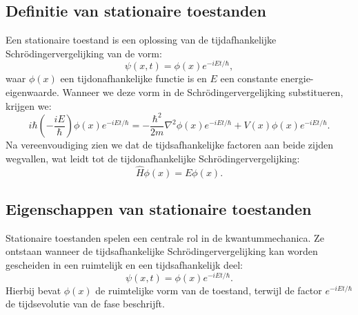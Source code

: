 \documentclass{report} %
\begin{document}
    \subsection{Definitie van stationaire toestanden}
    Een stationaire toestand is een oplossing van de tijdafhankelijke Schrödingervergelijking van de vorm:
    \[
        \psi(x,t) = \phi(x)e^{-iEt/\hbar},
    \]
    waar $\phi(x)$ een tijdonafhankelijke functie is en $E$ een constante energie-eigenwaarde.
    Wanneer we deze vorm in de Schrödingervergelijking substitueren, krijgen we:
    \[
        i\hbar \left(-\frac{iE}{\hbar}\right) \phi(x)e^{-iEt/\hbar} = -\frac{\hbar^2}{2m} \nabla^2 \phi(x)e^{-iEt/\hbar} + V(x)\phi(x)e^{-iEt/\hbar}.
    \]
    Na vereenvoudiging zien we dat de tijdsafhankelijke factoren aan beide zijden wegvallen, wat leidt tot de tijdonafhankelijke Schrödingervergelijking:
    \[
        \hat{H}\phi(x) = E\phi(x).
    \]

    \subsection{Eigenschappen van stationaire toestanden}

    Stationaire toestanden spelen een centrale rol in de kwantummechanica. Ze
    ontstaan wanneer de tijdsafhankelijke Schrödingervergelijking kan worden
    gescheiden in een ruimtelijk en een tijdsafhankelijk deel:
    \[
        \psi(x,t)=\phi(x)e^{-iEt/\hbar}.
    \]
    Hierbij bevat \(\phi(x)\) de ruimtelijke vorm van de toestand, terwijl de factor
    \(e^{-iEt/\hbar}\) de tijdsevolutie van de fase beschrijft.
\end{document}
